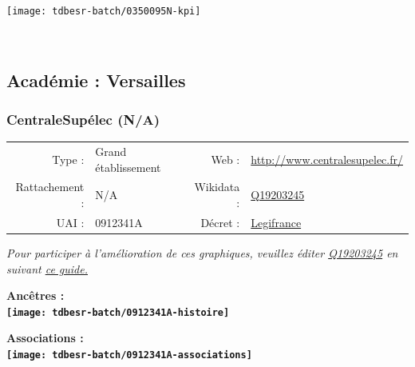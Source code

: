 \documentclass[12pt,french,]{article}
\begin{document}
\begin{center}\texttt{[image: tdbesr-batch/0350095N-kpi]} \end{center}\checkoddpage

\ifoddpage \fi ~\newpage  

\hypertarget{acaduxe9mie-versailles-1}{%
\subsection{Académie : Versailles}\label{acaduxe9mie-versailles-1}}

\hypertarget{centralesupuxe9lec-na}{%
\subsubsection{CentraleSupélec (N/A)}\label{centralesupuxe9lec-na}}

\begin{tabular*}{\textwidth}{rp{5cm}rl}  
\hline  
Type : & Grand établissement & Web : &\href{http://www.centralesupelec.fr/}{http://www.centralesupelec.fr/} \\  
Rattachement : & N/A & Wikidata : & \href{https://www.wikidata.org/entity/Q19203245}{Q19203245} \\  
UAI : & 0912341A & Décret : & \href{http://legifrance.gouv.fr/affichTexte.do?cidTexte=JORFTEXT000030001939&dateTexte=&categorieLien=id}{Legifrance} \\  
\hline  
\end{tabular*}

\textit{\scriptsize Pour participer à l'amélioration de ces graphiques, veuillez éditer  \href{https://www.wikidata.org/entity/Q19203245}{Q19203245}  en suivant \href{https://github.com/cpesr/wikidataESR/blob/master/Rmd/wikidataESR.md}{ce guide.}}

\vspace{1cm}  
\begin{minipage}[b]{0.50\textwidth}\begin{center} \bf Ancêtres : \\  
\texttt{[image: tdbesr-batch/0912341A-histoire]} \end{center}\end{minipage}\begin{minipage}[b]{0.50\textwidth}\begin{center} \bf Associations : \\  
\texttt{[image: tdbesr-batch/0912341A-associations]} \end{center}\end{minipage}
\end{document}
